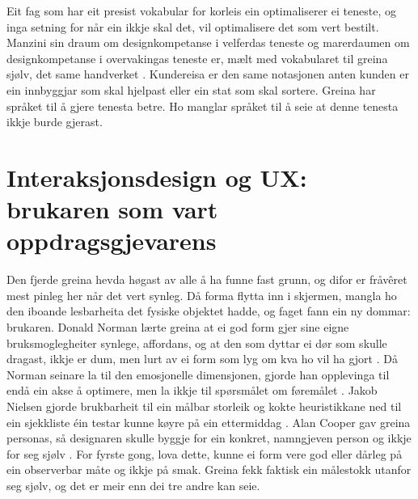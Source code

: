 Eit fag som har eit presist vokabular for korleis ein optimaliserer ei teneste, og inga setning for når ein ikkje skal det, vil optimalisere det som vert bestilt. Manzini sin draum om designkompetanse i velferdas teneste og marerdaumen om designkompetanse i overvakingas teneste er, mælt med vokabularet til greina sjølv, det same handverket \autocite{manzini2015}. Kundereisa er den same notasjonen anten kunden er ein innbyggjar som skal hjelpast eller ein stat som skal sortere. Greina har språket til å gjere tenesta betre. Ho manglar språket til å seie at denne tenesta ikkje burde gjerast.

\section{Interaksjonsdesign og UX: brukaren som vart oppdragsgjevarens}

Den fjerde greina hevda høgast av alle å ha funne fast grunn, og difor er fråvêret mest pinleg her når det vert synleg. Då forma flytta inn i skjermen, mangla ho den iboande lesbarheita det fysiske objektet hadde, og faget fann ein ny dommar: brukaren. Donald Norman lærte greina at ei god form gjer sine eigne bruksmoglegheiter synlege, affordans, og at den som dyttar ei dør som skulle dragast, ikkje er dum, men lurt av ei form som lyg om kva ho vil ha gjort \autocite{norman2013}. Då Norman seinare la til den emosjonelle dimensjonen, gjorde han opplevinga til endå ein akse å optimere, men la ikkje til spørsmålet om føremålet \autocite{norman2004emotional}. Jakob Nielsen gjorde brukbarheit til ein målbar storleik og kokte heuristikkane ned til ein sjekkliste éin testar kunne køyre på ein ettermiddag \autocite{nielsen1993, nielsen1990heuristic}. Alan Cooper gav greina personas, så designaren skulle byggje for ein konkret, namngjeven person og ikkje for seg sjølv \autocite{cooper1999inmates}. For fyrste gong, lova dette, kunne ei form vere god eller dårleg på ein observerbar måte og ikkje på smak. Greina fekk faktisk ein målestokk utanfor seg sjølv, og det er meir enn dei tre andre kan seie.

